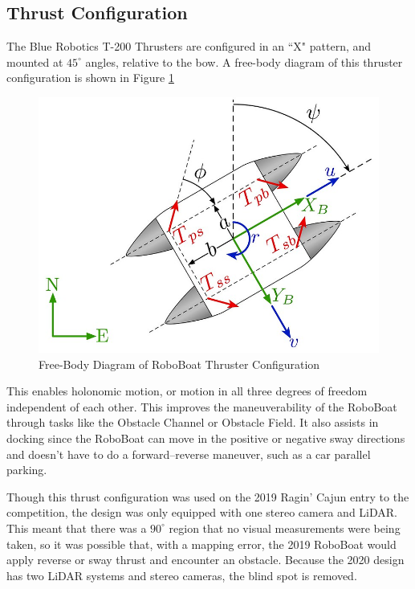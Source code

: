 \documentclass[letterpaper, 12 pt, conference]{ieeeconf}
\begin{document}
\subsection{Thrust Configuration}
The Blue Robotics T-200 Thrusters are configured in an ``X" pattern, and mounted at $45^\circ$ angles, relative to the bow. A free-body diagram of this thruster configuration is shown in Figure \ref{fig:FBD}
%
\begin{figure}[tb]
\centering
\vspace{0.05in}
\includegraphics[width=\columnwidth]{Figures/FBD.jpg}
\caption{Free-Body Diagram of RoboBoat Thruster Configuration}
\label{fig:FBD}
\end{figure}
%
This enables holonomic motion, or motion in all three degrees of freedom independent of each other. This improves the maneuverability of the RoboBoat through tasks like the Obstacle Channel or Obstacle Field. It also assists in docking since the RoboBoat can move in the positive or negative sway directions and doesn't have to do a forward--reverse maneuver, such as a car parallel parking.

Though this thrust configuration was used on the 2019 Ragin' Cajun entry to the competition, the design was only equipped with one stereo camera and LiDAR. This meant that there was a $90^\circ$ region that no visual measurements were being taken, so it was possible that, with a mapping error, the 2019 RoboBoat would apply reverse or sway thrust and encounter an obstacle. Because the 2020 design has two LiDAR systems and stereo cameras, the blind spot is removed.
\end{document}
